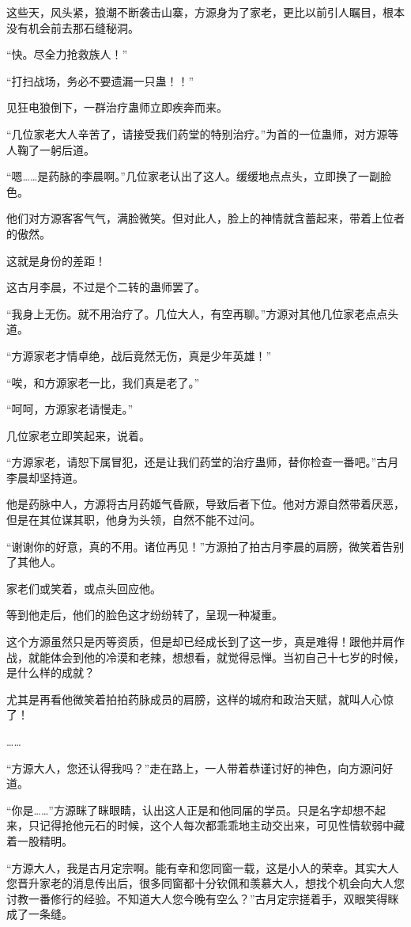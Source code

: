 \begin{this_body}
这些天，风头紧，狼潮不断袭击山寨，方源身为了家老，更比以前引人瞩目，根本没有机会前去那石缝秘洞。

“快。尽全力抢救族人！”

“打扫战场，务必不要遗漏一只蛊！！”

见狂电狼倒下，一群治疗蛊师立即疾奔而来。

“几位家老大人辛苦了，请接受我们药堂的特别治疗。”为首的一位蛊师，对方源等人鞠了一躬后道。

“嗯……是药脉的李晨啊。”几位家老认出了这人。缓缓地点点头，立即换了一副脸色。

他们对方源客客气气，满脸微笑。但对此人，脸上的神情就含蓄起来，带着上位者的傲然。

这就是身份的差距！

这古月李晨，不过是个二转的蛊师罢了。

“我身上无伤。就不用治疗了。几位大人，有空再聊。”方源对其他几位家老点点头道。

“方源家老才情卓绝，战后竟然无伤，真是少年英雄！”

“唉，和方源家老一比，我们真是老了。”

“呵呵，方源家老请慢走。”

几位家老立即笑起来，说着。

“方源家老，请恕下属冒犯，还是让我们药堂的治疗蛊师，替你检查一番吧。”古月李晨却坚持道。

他是药脉中人，方源将古月药姬气昏厥，导致后者下位。他对方源自然带着厌恶，但是在其位谋其职，他身为头领，自然不能不过问。

“谢谢你的好意，真的不用。诸位再见！”方源拍了拍古月李晨的肩膀，微笑着告别了其他人。

家老们或笑着，或点头回应他。

等到他走后，他们的脸色这才纷纷转了，呈现一种凝重。

这个方源虽然只是丙等资质，但是却已经成长到了这一步，真是难得！跟他并肩作战，就能体会到他的冷漠和老辣，想想看，就觉得忌惮。当初自己十七岁的时候，是什么样的成就？

尤其是再看他微笑着拍拍药脉成员的肩膀，这样的城府和政治天赋，就叫人心惊了！

……

“方源大人，您还认得我吗？”走在路上，一人带着恭谨讨好的神色，向方源问好道。

“你是……”方源眯了眯眼睛，认出这人正是和他同届的学员。只是名字却想不起来，只记得抢他元石的时候，这个人每次都乖乖地主动交出来，可见性情软弱中藏着一股精明。

“方源大人，我是古月定宗啊。能有幸和您同窗一载，这是小人的荣幸。其实大人您晋升家老的消息传出后，很多同窗都十分钦佩和羡慕大人，想找个机会向大人您讨教一番修行的经验。不知道大人您今晚有空么？”古月定宗搓着手，双眼笑得眯成了一条缝。


\end{this_body}
